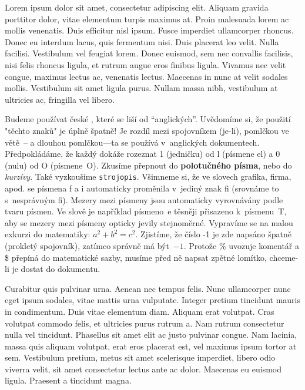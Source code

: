 Lorem ipsum dolor sit amet, consectetur adipiscing elit. Aliquam gravida porttitor dolor, vitae elementum turpis maximus at. Proin malesuada lorem ac mollis venenatis. Duis efficitur nisl ipsum. Fusce imperdiet ullamcorper rhoncus. Donec eu interdum lacus, quis fermentum nisi. Duis placerat leo velit. Nulla facilisi. Vestibulum vel feugiat lorem. Donec euismod, sem nec convallis facilisis, nisi felis rhoncus ligula, et rutrum augue eros finibus ligula. Vivamus nec velit congue, maximus lectus ac, venenatis lectus. Maecenas in nunc at velit sodales mollis. Vestibulum sit amet ligula purus. Nullam massa nibh, vestibulum at ultricies ac, fringilla vel libero.

\itemskip
\bod Budeme používat české , které se liší od ``anglických''.
     Uvědomíme si, že použití "těchto znaků" je úplně špatně!
\bod Je rozdíl mezi spojovníkem (je-li), pomlčkou ve větě~--
     a dlouhou pomlčkou---ta se používá v~anglických dokumentech.
\bod Předpokládáme, že každý dokáže rozeznat 1 (jedničku) od l
     (písmene el) a 0 (nulu) od O (písmene~O).
\bod Zkusíme přepnout do {\bf polotučného písma}, nebo do
     {\it kurzívy}. Také vyzkoušíme {\tt strojopis}.
\bod Všimneme si, že ve slovech grafika, firma, apod. se písmena
     f a i automaticky proměnila v~jediný znak fi (srovnáme to
     s~nesprávným f\/i).
\bod Mezery mezi písmeny jsou automaticky vyrovnávány podle tvaru písmen.
     Ve slově  je například písmeno~e těsněji přisazeno
     k~písmenu~T, aby se mezery mezi písmeny opticky jevily stejnoměrné.
\bod Vypravíme se na malou exkurzi do matematiky: $a^2 + b^2 = c^2$.
     Zjistíme, že číslo -1 je zde napsáno špatně (prokletý spojovník),
     zatímco správně má být~$-1$.
\bod Protože \% uvozuje komentář a \$ přepíná do matematické sazby,
     musíme před ně napsat zpětné lomítko, chceme-li je dostat do dokumentu.
\itemskip

Curabitur quis pulvinar urna. Aenean nec tempus felis. Nunc ullamcorper nunc eget ipsum sodales, vitae mattis urna vulputate. Integer pretium tincidunt mauris in condimentum. Duis vitae elementum diam. Aliquam erat volutpat. Cras volutpat commodo felis, et ultricies purus rutrum a. Nam rutrum consectetur nulla vel tincidunt. Phasellus sit amet elit ac justo pulvinar congue. Nam lacinia, massa quis aliquam volutpat, erat eros placerat est, vel maximus ipsum tortor at sem. Vestibulum pretium, metus sit amet scelerisque imperdiet, libero odio viverra velit, sit amet consectetur lectus ante ac dolor. Maecenas eu euismod ligula. Praesent a tincidunt magna.

